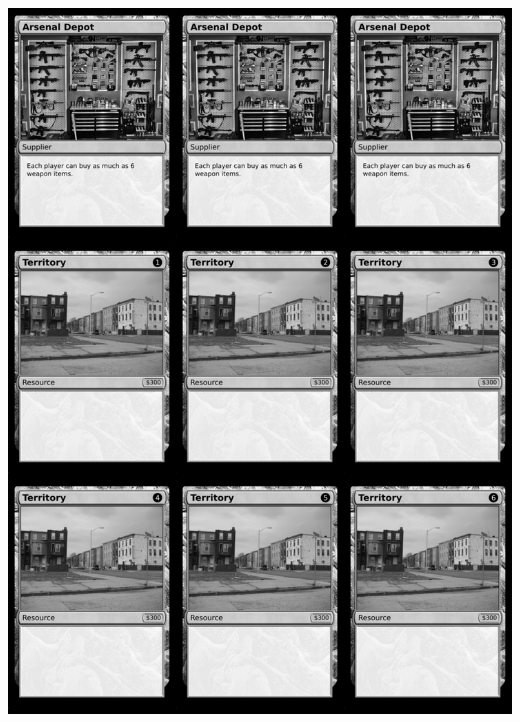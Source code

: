 \documentclass[a4paper]{article}
\begin{document}
\begin{center}
	\centering
	\includegraphics[width=190.5mm,height=266.7mm]{output/temp/page23.png}
\end{center}

\newpage
\end{document}
